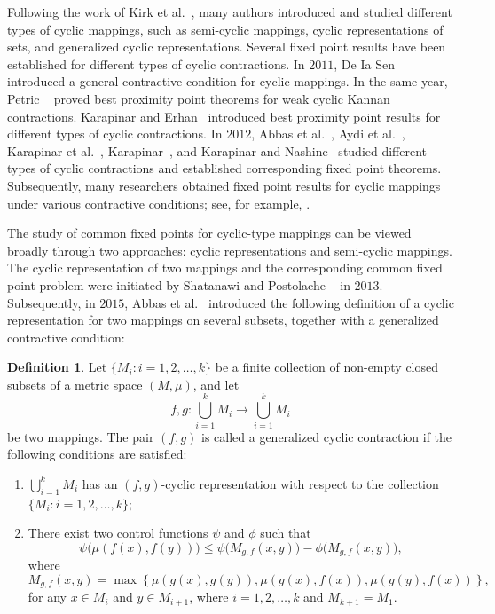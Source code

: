 \documentclass[11pt,a4paper,margin=1in]{amsart}
\theoremstyle{plain}
\theoremstyle{definition}
\newtheorem{definition}[theorem]{Definition}
\theoremstyle{remark}
\begin{document}
Following the work of Kirk et al.~\cite{W.12}, many authors introduced and
studied different types of cyclic mappings, such as semi-cyclic mappings,
cyclic representations of sets, and generalized cyclic representations.
Several fixed point results have been established for different types of
cyclic contractions. In $2011$, De Ia Sen~\cite{M.Dla} introduced a general
contractive condition for cyclic mappings. In the same year, Petric
~\cite{M.A} proved best proximity point theorems for weak cyclic Kannan
contractions. Karapinar and Erhan~\cite{Erthan} introduced best proximity
point results for different types of cyclic contractions. In $2012$, Abbas
et al.~\cite{M.Ab.}, Aydi et al.~\cite{H.A.C}, Karapinar et al.~\cite{E.K},
Karapinar~\cite{E.}, and Karapinar and Nashine~\cite{E.H} studied different
types of cyclic contractions and established corresponding fixed point
theorems. Subsequently, many researchers obtained fixed point results for
cyclic mappings under various contractive conditions; see, for example,
\cite{A.H,G.H,H.M.D,G.N,H.M,J.M,J03,J04,J05,P.S}.

The study of common fixed points for cyclic-type mappings can be viewed
broadly through two approaches: cyclic representations and semi-cyclic
mappings. The cyclic representation of two mappings and the corresponding
common fixed point problem were initiated by Shatanawi and Postolache
~\cite{W.S} in $2013$. Subsequently, in $2015$, Abbas et al.~\cite{M.09}
introduced the following definition of a cyclic representation for two
mappings on several subsets, together with a generalized contractive condition:

\begin{definition}\cite{M.09}\label{def:generalized-cyclic-contraction}
Let $\{M_i:i=1,2,\ldots,k\}$ be a finite collection of non-empty closed
subsets of a metric space $(M,\mu)$, and let
\[
f,g:\bigcup_{i=1}^{k}M_i\to\bigcup_{i=1}^{k}M_i
\]
be two mappings. The pair $(f,g)$ is called a generalized cyclic
contraction if the following conditions are satisfied:
\begin{enumerate}
    \item $\displaystyle\bigcup_{i=1}^{k}M_i$ has an $(f,g)$-cyclic
    representation with respect to the collection
    $\{M_i:i=1,2,\ldots,k\}$;

    \item There exist two control functions $\psi$ and $\phi$ such that
    \[
    \psi\bigl(\mu(f(x),f(y))\bigr)
    \leq
    \psi\bigl(M_{g,f}(x,y)\bigr)
    -
    \phi\bigl(M_{g,f}(x,y)\bigr),
    \]
    where
    \[
    M_{g,f}(x,y)
    =
    \max\left\{
    \mu(g(x),g(y)),
    \mu(g(x),f(x)),
    \mu(g(y),f(x))
    \right\},
    \]
    for any $x\in M_i$ and $y\in M_{i+1}$, where
    $i=1,2,\ldots,k$ and $M_{k+1}=M_1$.
\end{enumerate}
\end{definition}
\end{document}

